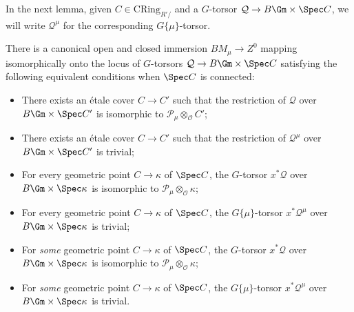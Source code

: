 \documentclass[10pt]{amsart}
\begin{document}
In the next lemma, given $C\in \mathrm{CRing}_{R'/}$ and a $G$-torsor $\mathcal{Q}\to B\Gm\times \Spec C$, we will write $\mathcal{Q}^\mu$ for the corresponding $G\{\mu\}$-torsor.
\begin{lemma}
\label{lem:BGmu_trivial_locus}
There is a canonical open and closed immersion $BM_\mu\to Z^0$ mapping isomorphically onto the locus of $G$-torsors $\mathcal{Q}\to B\Gm\times \Spec C$ satisfying the following equivalent conditions when $\Spec C$ is connected:
\begin{itemize}
    \item[(1a)] There exists an \'etale cover $C\to C'$ such that the restriction of $\mathcal{Q}$ over $B\Gm\times \Spec C'$ is isomorphic to $\mathcal{P}_\mu\otimes_{\mathcal{O}}C'$;

    \item[(1b)]There exists an \'etale cover $C\to C'$ such that the restriction of $\mathcal{Q}^\mu$ over $B\Gm\times \Spec C'$ is trivial;
    \item[(2a)]For every geometric point $C\to \kappa$ of $\Spec C$, the $G$-torsor $x^*\mathcal{Q}$ over $B\Gm\times\Spec \kappa$ is isomorphic to $\mathcal{P}_\mu\otimes_{\mathcal{O}}\kappa$;
     \item[(2b)]For every geometric point $C\to \kappa$ of $\Spec C$, the $G\{\mu\}$-torsor $x^*\mathcal{Q}^\mu$ over $B\Gm\times\Spec \kappa$ is trivial;
    \item[(3a)]For \emph{some} geometric point $C\to \kappa$ of $\Spec C$, the $G$-torsor $x^* \mathcal{Q}$ over $B\Gm\times\Spec \kappa$ is isomorphic to $\mathcal{P}_\mu\otimes_{\mathcal{O}}\kappa$;
    \item[(3b)]For \emph{some} geometric point $C\to \kappa$ of $\Spec C$, the $G\{\mu\}$-torsor $x^* \mathcal{Q}^\mu$ over $B\Gm\times\Spec \kappa$ is trivial.
 \end{itemize}
\end{lemma}
\end{document}

